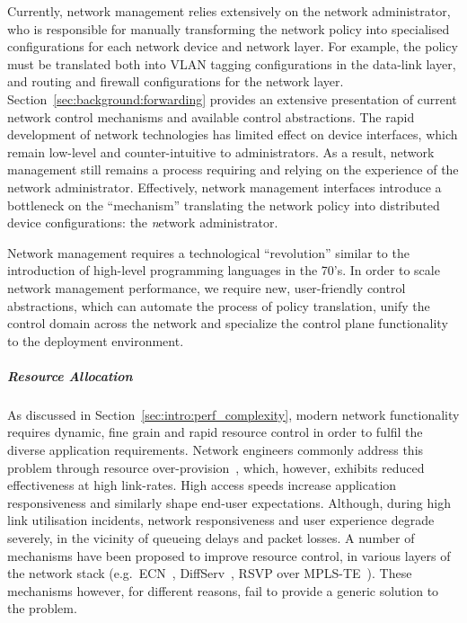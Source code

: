 Currently, network management relies extensively on the network
administrator, who is responsible for manually transforming the network policy into
specialised configurations for each network device and network layer.  For
example, the policy must be translated both into VLAN tagging configurations in
the data-link layer, and routing and firewall configurations for the network
layer.  Section~\ref{sec:background:forwarding} provides an extensive
presentation of current network control mechanisms and available control
abstractions.  The rapid development of network technologies has limited
effect on device interfaces, which remain low-level and counter-intuitive to
administrators. As a result, network management still remains a process
requiring and relying on the experience of the network administrator.  Effectively,
network management interfaces introduce a bottleneck on the ``mechanism''
translating the network policy into distributed device configurations: the
{\emph network administrator}.

Network management requires a technological ``revolution'' similar to the
introduction of high-level programming languages in the 70's.  In order to
scale network management performance, we require new, user-friendly control
abstractions, which can automate the process of policy translation, unify the
control domain across the network and specialize the control plane
functionality to the deployment environment. 

\subparagraph*{Resource Allocation} 

As discussed in Section~\ref{sec:intro:perf_complexity}, modern network
functionality requires dynamic, fine grain and rapid resource control in order
to fulfil the diverse application requirements.  Network engineers commonly
address this problem through resource over-provision~, which,
however, exhibits reduced effectiveness at high link-rates. High access speeds
increase application responsiveness and similarly shape end-user
expectations.  Although, during high link utilisation incidents, network
responsiveness and user experience degrade severely, in the vicinity of
queueing delays and packet losses.  A number of mechanisms have been proposed to
improve resource control, in various layers of the network stack
(e.g.~ECN~, DiffServ~, RSVP over
MPLS-TE~). These mechanisms however, for different reasons,  fail to
provide a generic solution to the problem. 

